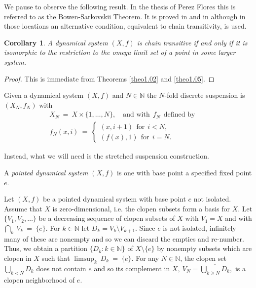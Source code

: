 \documentclass[12pt]{amsart}
\newtheorem{cor}[theo]{{\bfseries Corollary}}
\def \ol {\overline}
\def \N {\mathbb N}
\numberwithin{equation}{section}
\begin{document}
We pause to observe the following result. In the thesis of Perez Flores \cite{PF} this is referred to as the Bowen-Sarkovskii Theorem. It is proved in \cite{DF} and in \cite{S65} although in those locations an alternative condition, equivalent to chain transitivity, is used.

 \begin{cor}\label{cor1.06} A dynamical system $(X,f)$ is chain transitive if and only if it is isomorphic to the restriction to the omega limit set
 of a point in some larger system. \end{cor}

  \begin{proof} This is immediate from Theorems \ref{theo1.02}  and  \ref{theo1.05}.

\end{proof}\vspace{.5cm}



Given a dynamical system $(X,f)$ and $N \in \N$ the $N$-fold discrete suspension is $(X_N,f_N)$ with
\begin{equation}\label{eq2.01}\begin{split}
X_N \ = \ X \times \{ 1, \dots, N \}, \quad \text{and with} \ \ f_N \ \ \text{defined by} \\
f_N(x,i) \ = \ \begin{cases} (x,i+1) \ \ \text{for} \ \ i < N, \\ (f(x),1)  \ \ \text{for} \ \ i = N.\end{cases}\hspace{2cm}
\end{split}\end{equation}

Instead, what we will need is the stretched suspension construction.

A \emph{pointed dynamical system} $(X,f)$ is one with base point a specified fixed point $e$.


Let $(X,f)$ be a pointed dynamical system with base point $e$ not isolated.
Assume that $X$ is zero-dimensional, i.e.
the clopen subsets form a basis for $X$. Let $\{ V_1, V_2, \dots \}$ be a decreasing sequence of
clopen subsets of $X$ with $V_1 = X$ and with $\bigcap_k \ V_k \ = \ \{ e \}$. For $k \in \N$ let $D_k = V_k \setminus V_{k+1}$.
Since $e$  is not isolated, infinitely many of these are nonempty and so we can discard the empties and re-number. Thus,
we obtain a partition  $\{ D_k : k \in \N \}$ of $X \setminus \{ e \}$ by nonempty subsets which are clopen in $X$ such that
 $\limsup_k \  D_k \ = \ \{ e \}$. For any $N \in \N$, the clopen set $\bigcup_{k < N} D_k$ does not contain $e$ and
 so its complement in $X, \  V_N = \ol{\bigcup_{k \ge N} D_k },$ is a clopen neighborhood of $e$.
\end{document}
